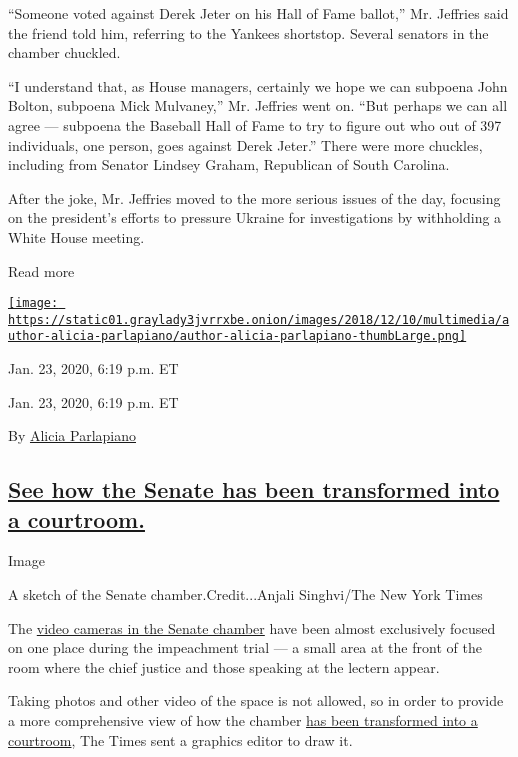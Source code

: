 ``Someone voted against Derek Jeter on his Hall of Fame ballot,'' Mr.
Jeffries said the friend told him, referring to the Yankees shortstop.
Several senators in the chamber chuckled.

``I understand that, as House managers, certainly we hope we can
subpoena John Bolton, subpoena Mick Mulvaney,'' Mr. Jeffries went on.
``But perhaps we can all agree --- subpoena the Baseball Hall of Fame to
try to figure out who out of 397 individuals, one person, goes against
Derek Jeter.'' There were more chuckles, including from Senator Lindsey
Graham, Republican of South Carolina.

After the joke, Mr. Jeffries moved to the more serious issues of the
day, focusing on the president's efforts to pressure Ukraine for
investigations by withholding a White House meeting.

Read more

\href{https://www.nytimes3xbfgragh.onion/by/alicia-parlapiano}{\texttt{[image: https://static01.graylady3jvrrxbe.onion/images/2018/12/10/multimedia/author-alicia-parlapiano/author-alicia-parlapiano-thumbLarge.png]}}

Jan. 23, 2020, 6:19 p.m. ET

Jan. 23, 2020, 6:19 p.m. ET

By \href{https://www.nytimes3xbfgragh.onion/by/alicia-parlapiano}{Alicia
Parlapiano}

\hypertarget{see-how-the-senate-has-been-transformed-into-a-courtroom}{%
\subsection{\texorpdfstring{\protect\hyperlink{see-how-the-senate-has-been-transformed-into-a-courtroom}{See
how the Senate has been transformed into a
courtroom.}}{See how the Senate has been transformed into a courtroom.}}\label{see-how-the-senate-has-been-transformed-into-a-courtroom}}

Image

A sketch of the Senate chamber.Credit...Anjali Singhvi/The New York
Times

The
\href{https://www.nytimes3xbfgragh.onion/2020/01/19/business/media/senate-impeachment-trial-media.html}{video
cameras in the Senate chamber} have been almost exclusively focused on
one place during the impeachment trial --- a small area at the front of
the room where the chief justice and those speaking at the lectern
appear.

Taking photos and other video of the space is not allowed, so in order
to provide a more comprehensive view of how the chamber
\href{https://www.nytimes3xbfgragh.onion/2020/01/17/us/politics/senate-impeachment-trial-furniture.html}{has
been transformed into a courtroom}, The Times sent a graphics editor to
draw it.

